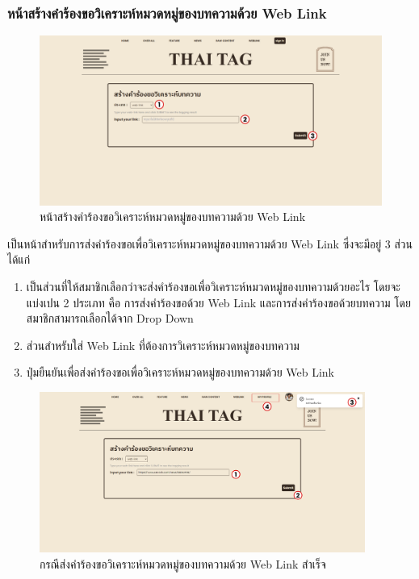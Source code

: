 \documentclass[12pt,oneside,openright,a4paper]{cpe-thai-project}
\begin{document}
        \subsubsection{หน้าสร้างคำร้องขอวิเคราะห์หมวดหมู่ของบทความด้วย Web Link}
          \begin{figure}[!ht]\centering
            \includegraphics[width=\textwidth]{./img/project_ui/4_5.png}
            \caption{หน้าสร้างคำร้องขอวิเคราะห์หมวดหมู่ของบทความด้วย Web Link}\label{fig:exp_weblink}
          \end{figure}
          \newpage
          \hspace{1cm}เป็นหน้าสําหรับการส่งคําร้องขอเพื่อวิเคราะห์หมวดหมู่ของบทความด้วย Web Link ซึ่งจะมีอยู่ 3 ส่วน ได้แก่
          \begin{enumerate}
            \item เป็นส่วนที่ให้สมาชิกเลือกว่าจะส่งคําร้องขอเพื่อวิเคราะห์หมวดหมู่ของบทความด้วยอะไร โดยจะแบ่งเปน 2 ประเภท คือ 
            การส่งคําร้องขอด้วย Web Link และการส่งคําร้องขอด้วยบทความ โดยสมาชิกสามารถเลือกได้จาก Drop Down
            \item ส่วนสําหรับใส่ Web Link ที่ต้องการวิเคราะห์หมวดหมู่ของบทความ
            \item ปุ่มยืนยันเพื่อส่งคําร้องขอเพื่อวิเคราะห์หมวดหมู่ของบทความด้วย Web Link
          \end{enumerate}
          \begin{figure}[!ht]\centering
            \includegraphics[width=0.95\textwidth]{./img/project_ui/4_6.png}
            \caption{กรณีส่งคำร้องขอวิเคราะห์หมวดหมู่ของบทความด้วย Web Link สำเร็จ}\label{fig:exp_weblink_succcess}
          \end{figure}
\end{document}
